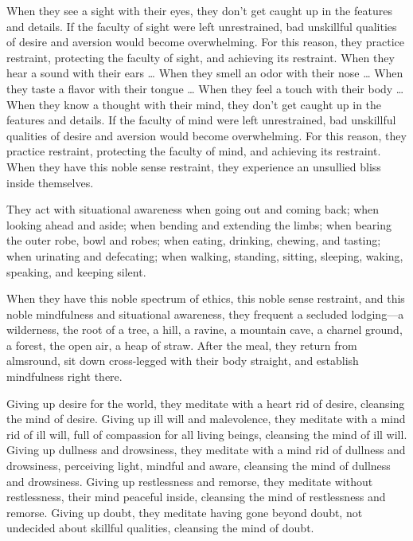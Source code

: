 \documentclass[12pt,openany]{book}%
\begin{document}
When they see a sight with their eyes, they don’t get caught up in the features and details. If the faculty of sight were left unrestrained, bad unskillful qualities of desire and aversion would become overwhelming. For this reason, they practice restraint, protecting the faculty of sight, and achieving its restraint. When they hear a sound with their ears … When they smell an odor with their nose … When they taste a flavor with their tongue … When they feel a touch with their body … When they know a thought with their mind, they don’t get caught up in the features and details. If the faculty of mind were left unrestrained, bad unskillful qualities of desire and aversion would become overwhelming. For this reason, they practice restraint, protecting the faculty of mind, and achieving its restraint. When they have this noble sense restraint, they experience an unsullied bliss inside themselves. 

They act with situational awareness when going out and coming back; when looking ahead and aside; when bending and extending the limbs; when bearing the outer robe, bowl and robes; when eating, drinking, chewing, and tasting; when urinating and defecating; when walking, standing, sitting, sleeping, waking, speaking, and keeping silent. 

When they have this noble spectrum of ethics, this noble sense restraint, and this noble mindfulness and situational awareness, they frequent a secluded lodging—a wilderness, the root of a tree, a hill, a ravine, a mountain cave, a charnel ground, a forest, the open air, a heap of straw. After the meal, they return from almsround, sit down cross-legged with their body straight, and establish mindfulness right there. 

Giving up desire for the world, they meditate with a heart rid of desire, cleansing the mind of desire. Giving up ill will and malevolence, they meditate with a mind rid of ill will, full of compassion for all living beings, cleansing the mind of ill will. Giving up dullness and drowsiness, they meditate with a mind rid of dullness and drowsiness, perceiving light, mindful and aware, cleansing the mind of dullness and drowsiness. Giving up restlessness and remorse, they meditate without restlessness, their mind peaceful inside, cleansing the mind of restlessness and remorse. Giving up doubt, they meditate having gone beyond doubt, not undecided about skillful qualities, cleansing the mind of doubt. 
\end{document}
